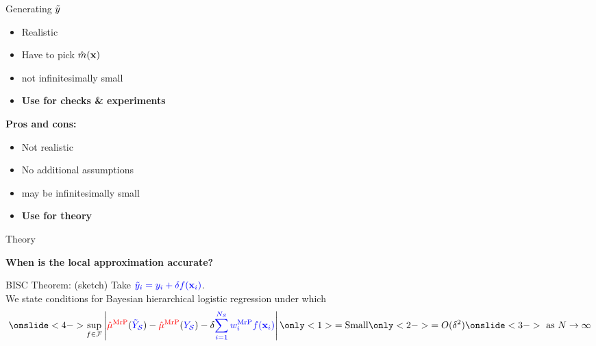 \begin{frame}[t]{Generating $\tilde{y}$}
{{    \begin{itemize}
    \item Realistic
    \item Have to pick $\hat{m}(\mathbf{x})$
    \item \surcol{$\Ytil - \Ysur$} not infinitesimally small
    \item \textbf{Use for checks \& experiments}
    \end{itemize}
    }
    {
\textbf{Pros and cons:}
    \begin{itemize}
    \item Not realistic
    \item No additional assumptions
    \item \surcol{$\Ytil - \Ysur$} may be infinitesimally small
    \item \textbf{Use for theory}
    \end{itemize}
    }
}



\end{frame}


\begin{frame}[c]{Theory}

\textbf{When is the local approximation accurate?}

\begin{block}{BISC Theorem: (sketch)}
    Take $\textcolor{blue}{\tilde{y}_i = y_i + \delta f(\mathbf{x}_i)}$.\\[1em]
    We state conditions for Bayesian hierarchical logistic regression under which
$$
\onslide<4->{\sup_{f \in \mathcal{F}}}
\abs{
    \muhatmrp[\Ytil] - \muhatmrp
    - \delta \surcol{\sumsur \w_i^\mrp \f(\x_i)}
}
\only<1>{ = \textrm{Small}}
\only<2->{ = O(\delta^2)}
\onslide<3->{\textrm{ as }N \rightarrow \infty}
$$
\end{block}



\end{frame}


